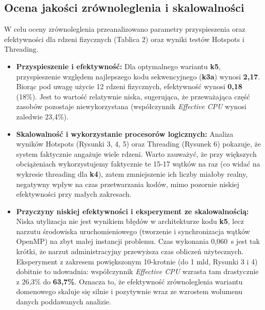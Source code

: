 \documentclass[10pt]{article}
\begin{document}
\subsection{Ocena jakości zrównoleglenia i skalowalności}
W celu oceny zrównoleglenia przeanalizowano parametry przyspieszenia oraz efektywności dla rdzeni fizycznych (Tablica 2) oraz wyniki testów Hotspots i Threading.
\begin{itemize}
    \item \textbf{Przyspieszenie i efektywność:} Dla optymalnego wariantu \textbf{k5}, przyspieszenie względem najlepszego kodu sekwencyjnego (\textbf{k3a}) 
	wynosi \textbf{2,17}. Biorąc pod uwagę użycie 12 rdzeni fizycznych, efektywność wynosi \textbf{0,18} (18\%). Jest to wartość relatywnie niska, sugerująca, 
	że przeważająca część zasobów pozostaje niewykorzystana (współczynnik \textit{Effective CPU} wynosi zaledwie 23,4\%).

    \item \textbf{Skalowalność i wykorzystanie procesorów logicznych:} Analiza wyników Hotspots (Rysunki 3, 4, 5) oraz Threading (Rysunek 6) pokazuje, 
    że system faktycznie angażuje wiele rdzeni. Warto zauważyć, że przy większych obciążeniach wykorzystujemy faktycznie te 15-17 wątków na raz (co widać na wykresie threading dla \textbf{k4}), 
    zatem zmniejszenie ich liczby miałoby realny, negatywny wpływ na czas przetwarzania kodów, mimo pozornie niskiej efektywności przy małych zakresach.
    \item \textbf{Przyczyny niskiej efektywności i eksperyment ze skalowalnością:} Niska utylizacja nie jest wynikiem błędów w architekturze kodu \textbf{k5},
	lecz narzutu środowiska uruchomieniowego (tworzenie i synchronizacja wątków OpenMP) na zbyt małej instancji problemu. Czas wykonania 0,060~s jest tak krótki, 
	że narzut administracyjny przewyższa czas obliczeń użytecznych. Eksperyment z zakresem powiększonym 10-krotnie (do 1 mld, Rysunki 3 i 4) dobitnie to udowadnia:
	 współczynnik \textit{Effective CPU} wzrasta tam drastycznie z 26,3\% do \textbf{63,7\%}. Oznacza to, że efektywność zrównoleglenia wariantu domenowego skaluje 
	 się silnie i pozytywnie wraz ze wzrostem wolumenu danych poddawanych analizie.
\end{itemize}
\end{document}
